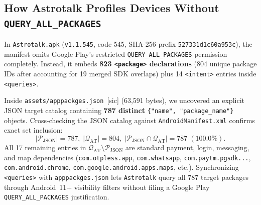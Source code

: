 \subsection{How Astrotalk Profiles Devices Without \texttt{QUERY\_ALL\_PACKAGES}}
In \texttt{Astrotalk.apk} (\texttt{v1.1.545}, code 545, SHA-256 prefix \texttt{527331d1c60a953c}), the manifest omits Google Play's restricted \texttt{QUERY\_ALL\_PACKAGES} permission completely. Instead, it embeds \textbf{823 \texttt{<package>} declarations} (804 unique package IDs after accounting for 19 merged SDK overlaps) plus 14 \texttt{<intent>} entries inside \texttt{<queries>}.

Inside \nolinkurl{assets/apppackges.json}~[sic] (63,591 bytes), we uncovered an explicit JSON target catalog containing \textbf{787 distinct} \texttt{\{"name", "package\_name"\}} objects. Cross-checking the JSON catalog against \texttt{AndroidManifest.xml} confirms exact set inclusion:
\[
|\mathcal{P}_{\mathrm{JSON}}|=787,\; |\mathcal{Q}_{\mathrm{AT}}|=804,\; |\mathcal{P}_{\mathrm{JSON}} \cap \mathcal{Q}_{\mathrm{AT}}|=787\;(100.0\%).
\]
All 17 remaining entries in $\mathcal{Q}_{\mathrm{AT}} \setminus \mathcal{P}_{\mathrm{JSON}}$ are standard payment, login, messaging, and map dependencies (\nolinkurl{com.otpless.app}, \nolinkurl{com.whatsapp}, \nolinkurl{com.paytm.pgsdk...}, \nolinkurl{com.android.chrome}, \nolinkurl{com.google.android.apps.maps}, etc.). Synchronizing \texttt{<queries>} with \nolinkurl{apppackges.json} lets \texttt{Astrotalk} query all 787 target packages through Android~11+ visibility filters without filing a Google Play \texttt{QUERY\_ALL\_PACKAGES} justification.

